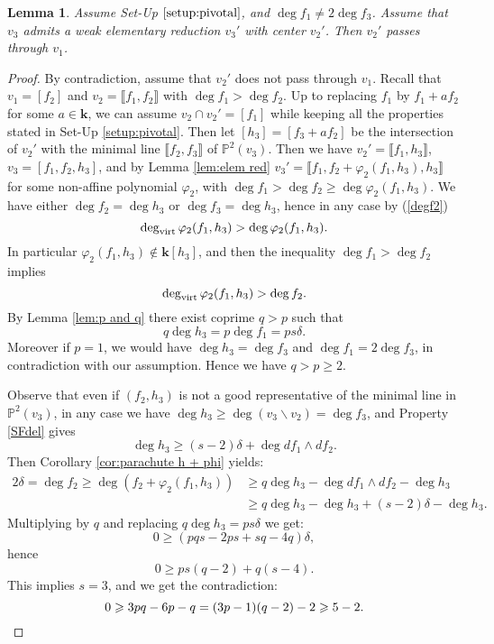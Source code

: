 \documentclass[reqno,oneside,11pt]{amsart}
\theoremstyle{plain}
\newtheorem{lemma}[theorem]{Lemma}
\theoremstyle{definition}
\newcommand{\p}{\mathbb{P}}
\newcommand{\K}{\mathbf{k}}
\renewcommand{\phi}{\varphi}
\newcommand{\dvirt}{\deg_{\text{\rm virt}}}
\newcommand{\llb}{\llbracket}
\newcommand{\rrb}{\rrbracket}
\newcommand{\lines}[1]{\p^2(#1)}
\renewcommand{\ge}{\geqslant}
\begin{document}
\begin{lemma} \label{lem:no outer reduction}
Assume Set-Up $\ref{setup:pivotal}$, and $\deg f_1 \neq 2 \deg f_3$.
Assume that $v_3$ admits a weak elementary reduction $v_3'$ with center $v_2'$.
Then $v_2'$ passes through $v_1$.
\end{lemma}

\begin{proof}
By contradiction, assume that $v_2'$ does not pass through $v_1$.
Recall that $v_1= [ f_2 ]$ and $v_2 = \llb f_1, f_2 \rrb$ with $\deg
f_1 > \deg f_2$.
Up to replacing $f_1$ by $f_1 + af_2$ for some $a \in \K$, we can assume  $v_2
\cap v_2' = [ f_1 ]$ while keeping all the properties stated in Set-Up
\ref{setup:pivotal}.
Then let $[ h_3 ] = [f_3 + af_2]$ be the intersection of $v_2'$ with the
minimal line $\llb f_2, f_3 \rrb$ of $\lines{v_3}$.
Then we have $v_2' = \llb f_1, h_3 \rrb$,  $v_3 = [f_1, f_2, h_3]$, and by
Lemma \ref{lem:elem red} $v_3' = \llb f_1, f_2+\phi_2(f_1,h_3), h_3 \rrb$ for
some non-affine polynomial $\phi_2$, with
$\deg f_1 > \deg f_2 \ge \deg{\phi_2}(f_1,h_3)$.
We have either $\deg f_2 = \deg
h_3$ or $\deg f_3 = \deg h_3$, hence in any case by (\ref{degf2})
$$\dvirt \phi_2(f_1,h_3) > \deg \phi_2(f_1,h_3).$$
In particular $\phi_2(f_1,h_3) \not\in \K[h_3]$, and then the inequality $\deg
f_1 > \deg f_2$ implies
$$\dvirt \phi_2(f_1,h_3) > \deg f_2.$$
By Lemma \ref{lem:p and q} there exist coprime $q > p$ such that
$$q \deg h_3 = p \deg f_1 = ps\delta.$$
Moreover if $p = 1$, we would have $\deg h_3 = \deg f_3$ and $\deg f_1 = 2 \deg
f_3$, in contradiction with our assumption. Hence we have $q > p \ge 2$.

Observe that even if $(f_2, h_3)$ is not a good representative of the minimal
line in $\lines{v_3}$, in any case we have $\deg h_3 \ge \deg(v_3 \smallsetminus
v_2) =   \deg f_3$, and Property \ref{SFdel} gives
$$\deg h_3 \ge (s-2)\delta + \deg df_1 \wedge df_2.$$
Then Corollary \ref{cor:parachute h + phi} yields:
\begin{align*}
2\delta = \deg f_2 \ge \deg (f_2 + \phi_2(f_1,h_3)) &\ge q\deg h_3 -
\deg df_1\wedge df_2 - \deg h_3 \\
& \ge q\deg h_3 - \deg h_3 + (s-2)\delta - \deg h_3.
\end{align*}
Multiplying by $q$ and replacing $q\deg h_3 = ps\delta$ we get:
$$0 \ge (pqs - 2ps + sq-4q )\delta,$$
hence
$$0 \ge ps (q-2) + q(s-4).$$
This implies $s = 3$, and we get the contradiction:
\begin{equation*}
0 \ge 3pq - 6p - q = (3p - 1)(q-2) -2 \ge 5 - 2.\qedhere
\end{equation*}
\end{proof}
\end{document}
